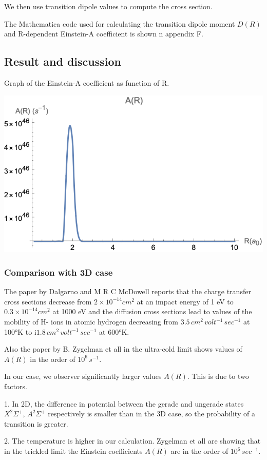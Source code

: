 We then use transition dipole values to compute the cross section. 

The Mathematica code used for calculating the transition dipole moment  $ D(R) $ and R-dependent Einstein-A coeﬃcient is shown n appendix F.

\subsection{Result and discussion}

Graph of the Einstein-A coefficient as function of R.

\includegraphics{AR-SI.png}

\subsubsection{Comparison with 3D case}

The paper by Dalgarno and  M R C McDowell \cite{DalgarnoMcDowel} reports that the charge transfer cross sections decrease from $ 2\times 10^{-14} cm^2 $ at an impact energy of 1 eV to $ 0.3\times 10^{-14} cm^2 $ at 1000 eV and the diffusion cross sections lead to values of the mobility of H- ions in atomic hydrogen decreasing from $ 3.5\,cm^2\,volt^{-1}\,sec^{-1} $ at 100°K to i$ 1.8\,cm^2\,volt^{-1}\,sec^{-1} $ at 600°K.

Also the paper by B. Zygelman et all \cite{ZL} in the ultra-cold limit shows values of $ A(R)$ in the order of $ 10^6\,s^{-1} $.

In our case, we observer significantly larger values $ A(R) $. This is due to two factors.

1. In 2D, the difference in potential between the gerade and ungerade states $ X^2\Sigma^+ $, $ A^2\Sigma^+ $ respectively is smaller than in the 3D case, so the probability of a transition is greater.

2. The temperature is higher in our calculation. Zygelman et all \cite{ZL} are showing that in the trickled limit the Einstein coefficients $ A(R) $ are in the order of $ 10^6\, sec^{-1} $.
